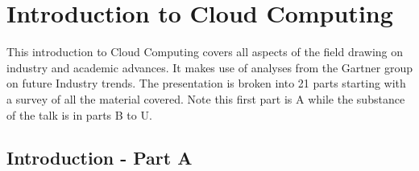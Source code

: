 
\FILENAME

\section{Introduction to Cloud Computing}
\label{s:icloud-fundamentals}

This introduction to Cloud Computing covers all aspects of the field
drawing on industry and academic advances. It makes use of analyses
from the Gartner group on future Industry trends. The presentation is
broken into 21 parts starting with a survey of all the material
covered. Note this first part is A while the substance of the talk is
in parts B to U.


%


\subsection{Introduction - Part A}\label{s:cloud-fundamentals-a}

